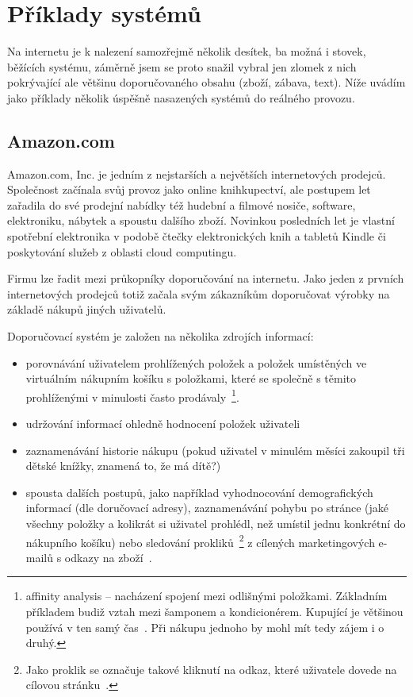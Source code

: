 \documentclass[thesis=M,czech]{FITthesis}[2014/05/07]
\begin{document}
\section{Příklady systémů}

Na internetu je k nalezení samozřejmě několik desítek, ba možná i stovek, běžících systému, záměrně jsem se proto snažil vybral jen zlomek z nich pokrývající ale většinu doporučovaného obsahu (zboží, zábava, text). Níže uvádím jako příklady několik úspěšně nasazených systémů do reálného provozu. 

\subsection{Amazon.com}

Amazon.com, Inc. je jedním z nejstarších a největších internetových prodejců. Společnost začínala svůj provoz jako online knihkupectví, ale postupem let zařadila do své prodejní nabídky též hudební a filmové nosiče, software, elektroniku, nábytek a spoustu dalšího zboží. Novinkou posledních let je vlastní spotřební elektronika v podobě čtečky elektronických knih a tabletů Kindle či poskytování služeb z oblasti cloud computingu.

Firmu lze řadit mezi průkopníky doporučování na internetu. Jako jeden z prvních internetových prodejců totiž začala svým zákazníkům doporučovat výrobky na základě nákupů jiných uživatelů.

Doporučovací systém je založen na několika zdrojích informací:

\begin{itemize}
	\item porovnávání uživatelem prohlížených položek a položek umístěných ve virtuálním nákupním košíku s položkami, které se společně s těmito prohlíženými v minulosti často prodávaly~\footnote{affinity analysis – nacházení spojení mezi odlišnými položkami. Základním příkladem budiž vztah mezi šamponem a kondicionérem. Kupující je většinou používá v ten samý čas~\cite{affinity}. Při nákupu jednoho by mohl mít tedy zájem i o druhý.}.
	\item udržování informací ohledně hodnocení položek uživateli
	\item zaznamenávání historie nákupu (pokud uživatel v minulém měsíci zakoupil tři dětské knížky, znamená to, že má dítě?)
	\item spousta dalších postupů, jako například vyhodnocování demografických informací (dle doručovací adresy), zaznamenávání pohybu po stránce (jaké všechny položky a kolikrát si uživatel prohlédl, než umístil jednu konkrétní do nákupního košíku) nebo sledování prokliků~\footnote{Jako proklik se označuje takové kliknutí na odkaz, které uživatele dovede na cílovou stránku~\cite{proklik}.} z cílených marketingových e-mailů s odkazy na zboží~\cite{amazonrec}.
\end{itemize}
\end{document}
